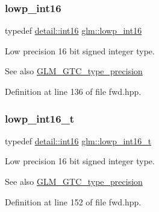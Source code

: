 \subsubsection{\texorpdfstring{lowp\+\_\+int16}{lowp\_int16}}
{\footnotesize\ttfamily typedef \hyperlink{namespaceglm_1_1detail_a375938874ca4f0a0982ec6373b56117b}{detail\+::int16} \hyperlink{group__gtc__type__precision_ga71fc0c399fa4780507748b643733f153}{glm\+::lowp\+\_\+int16}}

Low precision 16 bit signed integer type. \begin{DoxySeeAlso}{See also}
\hyperlink{group__gtc__type__precision}{G\+L\+M\+\_\+\+G\+T\+C\+\_\+type\+\_\+precision} 
\end{DoxySeeAlso}


Definition at line 136 of file fwd.\+hpp.

\mbox{\label{group__gtc__type__precision_gae34c3d53c4c1434fc9f26538b0185667}} 
\subsubsection{\texorpdfstring{lowp\+\_\+int16\+\_\+t}{lowp\_int16\_t}}
{\footnotesize\ttfamily typedef \hyperlink{namespaceglm_1_1detail_a375938874ca4f0a0982ec6373b56117b}{detail\+::int16} \hyperlink{group__gtc__type__precision_gae34c3d53c4c1434fc9f26538b0185667}{glm\+::lowp\+\_\+int16\+\_\+t}}

Low precision 16 bit signed integer type. \begin{DoxySeeAlso}{See also}
\hyperlink{group__gtc__type__precision}{G\+L\+M\+\_\+\+G\+T\+C\+\_\+type\+\_\+precision} 
\end{DoxySeeAlso}


Definition at line 152 of file fwd.\+hpp.

\mbox{\label{group__gtc__type__precision_gad9939c9d6fec1c6accc02a83c6500f08}} 
